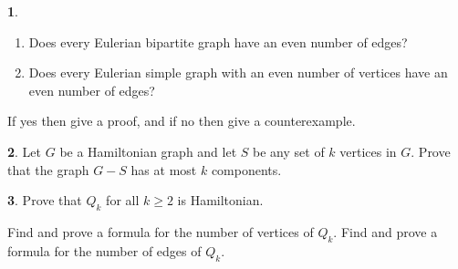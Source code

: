 \documentclass[12pt]{article}
\theoremstyle{definition}
\newtheorem{problem}{}
\begin{document}
\begin{problem} 
\begin{enumerate}
\item Does every Eulerian bipartite graph have an even number of edges?
\item Does every Eulerian simple graph with an even number of vertices have an even number of edges?
\end{enumerate}


If yes then give a proof, and if no then give a counterexample.
\end{problem}



\begin{problem}
 Let $G$ be a Hamiltonian graph and let $S$ be any set of $k$ vertices in $G$. Prove that the graph $G-S$ has at most $k$ components.
\end{problem}





\begin{problem}
Prove that $Q_k$ for all $k\geq 2$ is Hamiltonian.
\end{problem}

Find and prove a formula for the number of vertices of $Q_k$. Find and prove a formula for the number of edges of $Q_k$. 
\end{document}
